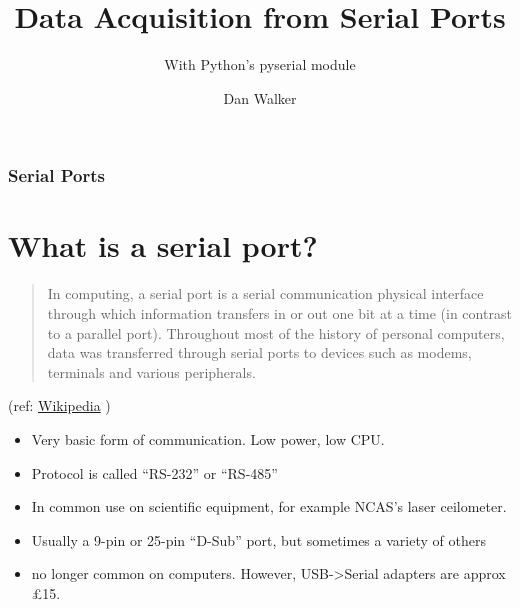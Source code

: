 \documentclass[aspectratio=1610,9pt]{beamer} %
\title{Data Acquisition from Serial Ports}
\subtitle{With Python's pyserial module}
\author{Dan Walker}
\begin{document}
\begin{frame}
\titlepage
\end{frame}

\begin{frame}
\frametitle{Serial Ports}

\section{What is a serial port?}

\begin{quote}
In computing, a serial port is a serial communication physical interface
through which information transfers in or out one bit at a time (in
contrast to a parallel port). Throughout most of the history of personal
computers, data was transferred through serial ports to devices such as
modems, terminals and various peripherals.
\end{quote}

(ref: \href{http://en.wikipedia.org/wiki/Serial_Port}{Wikipedia} )

\begin{itemize}
\itemsep1pt\parskip0pt
\item
  Very basic form of communication. Low power, low CPU.
\item
  Protocol is called ``RS-232'' or ``RS-485''
\item
  In common use on scientific equipment, for example NCAS's laser
  ceilometer.
\item
  Usually a 9-pin or 25-pin ``D-Sub'' port, but sometimes a variety of
  others
\item
  no longer common on computers. However, USB-\textgreater{}Serial
  adapters are approx £15.
\end{itemize}

\end{frame}
\end{document}
